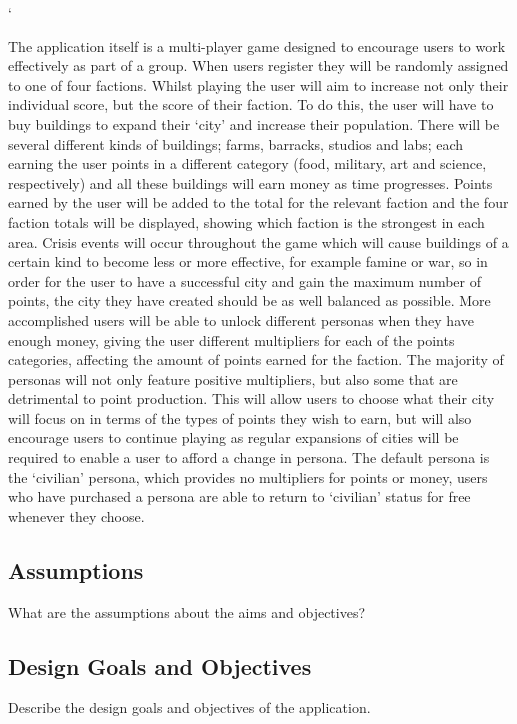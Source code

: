 `\documentclass{sig-alt-release2}
\begin{document}
The application itself is a multi-player game designed to encourage users to work effectively as part of a group. When users register they will be randomly assigned to one of four factions. Whilst playing the user will aim to increase not only their individual score, but the score of their faction. To do this, the user will have to buy buildings to expand their `city' and increase their population. There will be several different kinds of buildings; farms, barracks, studios and labs; each earning the user points in a different category (food, military, art and science, respectively) and all these buildings will earn money as time progresses. Points earned by the user will be added to the total for the relevant faction and the four faction totals will be displayed, showing which faction is the strongest in each area. Crisis events will occur throughout the game which will cause buildings of a certain kind to become less or more effective, for example famine or war, so in order for the user to have a successful city and gain the maximum number of points, the city they have created should be as well balanced as possible. More accomplished users will be able to unlock different personas when they have enough money, giving the user different multipliers for each of the points categories, affecting the amount of points earned for the faction. The majority of personas will not only feature positive multipliers, but also some that are detrimental to point production. This will allow users to choose what their city will focus on in terms of the types of points they wish to earn, but will also encourage users to continue playing as regular expansions of cities will be required to enable a user to afford a change in persona. The default persona is the `civilian' persona, which provides no multipliers for points or money, users who have purchased a persona are able to return to `civilian' status for free whenever they choose.

\subsection{Assumptions}

What are the assumptions about the aims and objectives?\\

\subsection{Design Goals and Objectives} 

Describe the design goals and objectives of the application.\\
\end{document}
